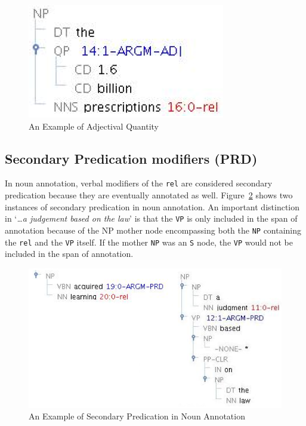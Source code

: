 \documentclass[11pt]{report}
\begin{document}
\begin{figure}[htbp]
\centering
\includegraphics[scale=0.4]{img/quantity.png}
\caption{An Example of Adjectival Quantity}
\label{fig: quantity}
\end{figure}

\subsection{Secondary Predication modifiers (PRD)}
\label{ssec: PRDnouns}
In noun annotation, verbal modifiers of the \texttt{rel} are considered secondary predication because they are eventually annotated as well. Figure~\ref{fig: nounPRD} shows two instances of secondary predication in noun annotation. An important distinction in `\textit{\ldots a judgement based on the law}' is that the \texttt{VP} is only included in the span of annotation because of the NP mother node encompassing both the \texttt{NP} containing the \texttt{rel} and the \texttt{VP} itself. If the mother \texttt{NP} was an \texttt{S} node, the \texttt{VP} would not be included in the span of annotation. 

\begin{figure}[htbp]
\centering
\includegraphics[scale=0.374]{img/nounprd.png}
\caption{An Example of Secondary Predication in Noun Annotation}
\label{fig: nounPRD}
\end{figure}
\end{document}
